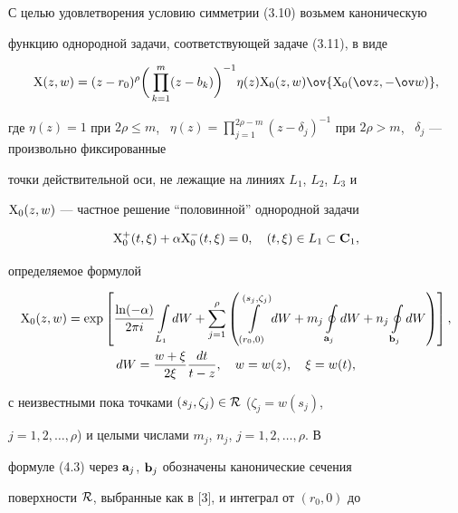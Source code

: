  


С целью удовлетворения условию симметрии (3.10) возьмем каноническую 


функцию однородной задачи, соответствующей задаче (3.11), в виде 


\begin{equation} 


\X(z,w)=(z-r_0)^\rho\bigg(\prod^m_{k=1}(z-b_k) \bigg)^{-1} 


\eta(z)\X_0(z,w)\ov{\X_0(\ov z,-\ov w)}, 


\end{equation} 


где $\eta(z)=1$ при $2\rho\le m$, \ $\eta(z)=\prod\limits^{2\rho-m}_{j=1} 


(z-\delta_j)^{-1}$ при $2\rho>m$, \ $\delta_j$ --- произвольно фиксированные 


точки действительной оси, не лежащие на линиях $L_1$, $L_2$, $L_3$ и 


$\mathrm X_0(z,w)$ --- частное решение ``половинной'' однородной задачи 


\begin{equation} 


\X^+_0(t,\xi)+\alpha\X^-_0(t,\xi)=0,\quad 


(t,\xi)\in L_1\subset\bold C_1, 


\end{equation} 


определяемое формулой 


\begin{gather} 


\X_0(z,w)=\exp\left[\frac{\ln(-\alpha)}{2\pi i}\int\limits_{L_1}dW+ 


\sum^\rho_{j=1}\left(\int\limits^{(s_j,\zeta_j)}_{(r_0,0)}dW+m_j 


\oint\limits_{\bold a_j}dW+n_j\oint\limits_{\bold b_j}dW\right)\right],\\ 


dW=\frac{w+\xi}{2\xi}\frac{dt}{t-z},\quad w=w(z),\quad \xi=w(t), 


\end{gather} 


с неизвестными пока точками $(s_j,\zeta_j)\in\cal R$ ($\zeta_j=w(s_j)$, 


$j=1,2,\dotsc,\rho$) и целыми числами $m_j$, $n_j$, $j=1,2,\dotsc,\rho$. В 


формуле (4.3) через $\bold a_j$, $\bold b_j$ обозначены канонические сечения 


поверхности $\cal R$, выбранные как в [3], и интеграл от $(r_0,0)$ до 


